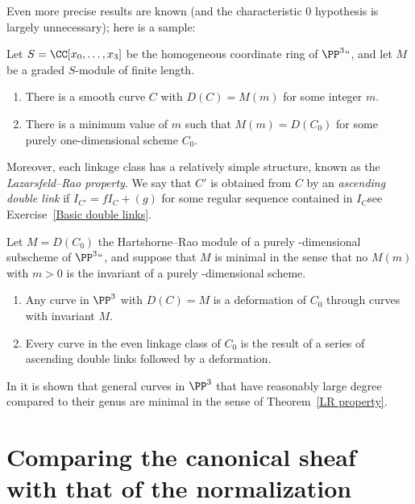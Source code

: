 \begin{fact}
Even more precise results are known (and the characteristic 0
hypothesis is largely unnecessary); here is a 
sample:
\begin{theorem}
Let $S = \CC[x_0, \dots, x_3]$ be the homogeneous coordinate ring of
$\PP^3` `$, and let $M$ be a graded $S$-module of finite length.
\begin{enumerate}
\item There is a smooth curve $C$ with $D(C) = M(m)$ for some integer $m$.
\item There is a minimum value of $m$ such that $M(m) = D(C_0)$ for some
purely one-dimensional scheme $C_0$.
\unif
\end{enumerate}
\end{theorem}

Moreover, each
linkage
class has a relatively simple structure, known
as the \emph{Lazarsfeld--Rao property}.
%
We say that $C'$ is obtained from $C$ by an \emph{ascending double link}
%
if $I_{C'} = fI_C+(g)$ for some regular sequence
contained in $I_C$\emdash see Exercise~\ref{Basic double links}.

\begin{npt}
\begin{theorem}[\cite{MR1087803}]
\label{LR property}
Let $M = D(C_0)$
the Hartshorne--Rao
module of a purely
\1-dimensional subscheme of $\PP^3` `$, and suppose that
%
$M$ is minimal in the sense that no $M(m)$ with $m>0$ is the invariant
of a purely \1-dimensional scheme.
\begin{enumerate}
\item Any curve in $\PP^3$ with $D(C) = M$ is a deformation of $C_{0}$
through curves with invariant $M$.
\item Every curve in the even linkage class of $C_0$ is the result of
a series of ascending double links followed by a deformation.
\end{enumerate}
\end{theorem}
\end{npt}

In \cite{MR714753} it is shown that general curves in $\PP^3$ that have
reasonably large degree compared to their genus are minimal in the sense
of Theorem~\ref{LR property}.
\end{fact}

\section{Comparing the canonical sheaf with that of the normalization}

